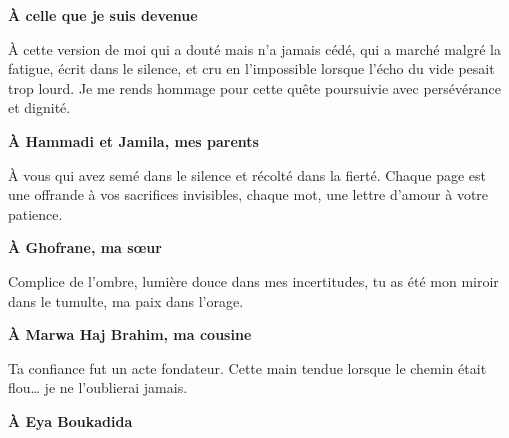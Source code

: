 \documentclass[a4paper,11pt]{report}
\begin{document}
\vspace{0.5cm}

\begin{center}
    \textbf{\Large À celle que je suis devenue}
\end{center}

\vspace{0.3cm}

\noindent
À cette version de moi qui a douté mais n’a jamais cédé,
qui a marché malgré la fatigue, écrit dans le silence,
et cru en l’impossible lorsque l’écho du vide pesait trop lourd.
Je me rends hommage pour cette quête poursuivie
avec persévérance et dignité.

\vspace{0.2cm}

\begin{center}
    \textbf{\Large À Hammadi et Jamila, mes parents}
\end{center}

\vspace{0.3cm}

\noindent
À vous qui avez semé dans le silence et récolté dans la fierté.
Chaque page est une offrande à vos sacrifices invisibles,
chaque mot, une lettre d’amour à votre patience.

\vspace{0.2cm}

\begin{center}
    \textbf{\Large À Ghofrane, ma sœur}
\end{center}

\vspace{0.3cm}

\noindent
Complice de l’ombre, lumière douce dans mes incertitudes,
tu as été mon miroir dans le tumulte, ma paix dans l’orage.

\vspace{0.2cm}

\begin{center}
    \textbf{\Large À Marwa Haj Brahim, ma cousine}
\end{center}

\vspace{0.3cm}

\noindent
Ta confiance fut un acte fondateur.
Cette main tendue lorsque le chemin était flou…
je ne l’oublierai jamais.

\vspace{0.5cm}

\begin{center}
    \textbf{\Large À Eya Boukadida}
\end{center}
\end{document}
